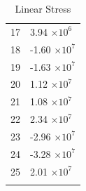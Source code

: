 \documentclass[a4paper,11pt]{article}
\begin{document}
\begin{center}
\begin{longtable}{|R{1.5cm}|R{2.6cm}|}
   17 &         3.94 $\times 10^{           6}$ \\
   18 &        -1.60 $\times 10^{           7}$ \\
   19 &        -1.63 $\times 10^{           7}$ \\
   20 &         1.12 $\times 10^{           7}$ \\
   21 &         1.08 $\times 10^{           7}$ \\
 {\color{OliveGreen}  22} & {\color{OliveGreen}        2.34 $\times 10^{           7}$} \\
   23 &        -2.96 $\times 10^{           7}$ \\
 {\color{red}  24} & {\color{red}       -3.28 $\times 10^{           7}$}\\
   25 &         2.01 $\times 10^{           7}$ \\
\bottomrule[0.8mm]                               
\caption{Linear Stress}             
\end{longtable}                                  
\end{center}                                     
\end{document}
